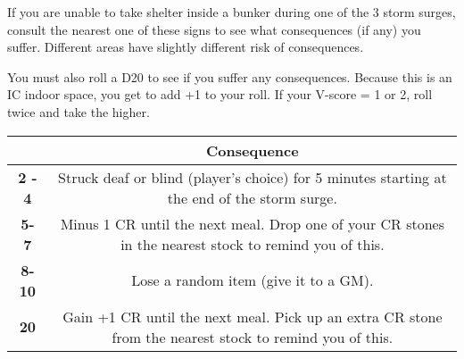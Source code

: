 \documentclass[green]{GL2020}
\begin{document}
\name{\gStormSurgeInside{}}

If you are unable to take shelter inside a bunker during one of the 3 storm surges, consult the nearest one of these signs to see what consequences (if any) you suffer. Different areas have slightly different risk of consequences.

You must also roll a D20 to see if you suffer any consequences. Because this is an IC indoor space, you get to add +1 to your roll. If your V-score = 1 or 2, roll twice and take the higher.

\begin{tabularx}{\textwidth}{|>{\centering\arraybackslash}c | >{\centering\arraybackslash}c |}
\hline
  {\large What you Roll +1} & {\large Consequence}  \\
\hline
  \textbf{2 - 4} & Struck deaf or blind (player’s choice) for 5 minutes starting at the end of the storm surge.  \\
\hline
  \textbf{5- 7} & Minus 1 CR until the next meal. Drop one of your CR stones in the nearest stock to remind you of this.  \\
\hline
  \textbf{8- 10} & Lose a random item (give it to a GM).  \\
\hline
 \textbf{20} & Gain +1 CR until the next meal. Pick up an extra CR stone from the nearest stock to remind you of this.  \\
\hline
\end{tabularx}
\end{document}

